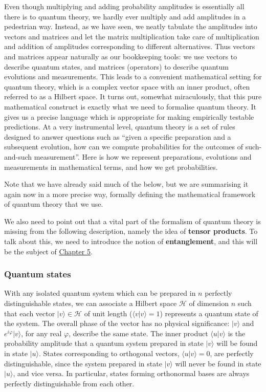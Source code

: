 \documentclass[fleqn]{article}
\begin{document}
Even though multiplying and adding probability amplitudes is essentially all there is to quantum theory, we hardly ever multiply and add amplitudes in a pedestrian way.
Instead, as we have seen, we neatly tabulate the amplitudes into vectors and matrices and let the matrix multiplication take care of multiplication and addition of amplitudes corresponding to different alternatives.
Thus vectors and matrices appear naturally as our bookkeeping tools: we use vectors to describe quantum states, and matrices (operators) to describe quantum evolutions and measurements.
This leads to a convenient mathematical setting for quantum theory, which is a complex vector space with an inner product, often referred to as a Hilbert space.
It turns out, somewhat miraculously, that this pure mathematical construct is exactly what we need to formalise quantum theory.
It gives us a precise language which is appropriate for making empirically testable predictions.
At a very instrumental level, quantum theory is a set of rules designed to answer questions such as ``given a specific preparation and a subsequent evolution, how can we compute probabilities for the outcomes of such-and-such measurement''.
Here is how we represent preparations, evolutions and measurements in mathematical terms, and how we get probabilities.

Note that we have already said much of the below, but we are summarising it again now in a more precise way, formally defining the mathematical framework of quantum theory that we use.

We also need to point out that a vital part of the formalism of quantum theory is missing from the following description, namely the idea of \textbf{tensor products}.
To talk about this, we need to introduce the notion of \textbf{entanglement}, and this will be the subject of \protect\hyperlink{chapter5}{Chapter 5}.

\hypertarget{quantum-states}{%
\subsubsection{Quantum states}\label{quantum-states}}

With any isolated quantum system which can be prepared in \(n\) perfectly distinguishable states, we can associate a Hilbert space \(\mathcal{H}\) of dimension \(n\) such that each vector \(|v\rangle\in\mathcal{H}\) of unit length (\(\langle v|v\rangle =1\)) represents a quantum state of the system.
The overall phase of the vector has no physical significance: \(|v\rangle\) and \(e^{i\varphi}|v\rangle\), for any real \(\varphi\), describe the same state.
The inner product \(\langle u|v\rangle\) is the probability amplitude that a quantum system prepared in state \(|v\rangle\) will be found in state \(|u\rangle\).
States corresponding to orthogonal vectors, \(\langle u|v\rangle=0\), are perfectly distinguishable, since the system prepared in state \(|v\rangle\) will never be found in state \(|u\rangle\), and vice versa.
In particular, states forming orthonormal bases are always perfectly distinguishable from each other.
\end{document}
